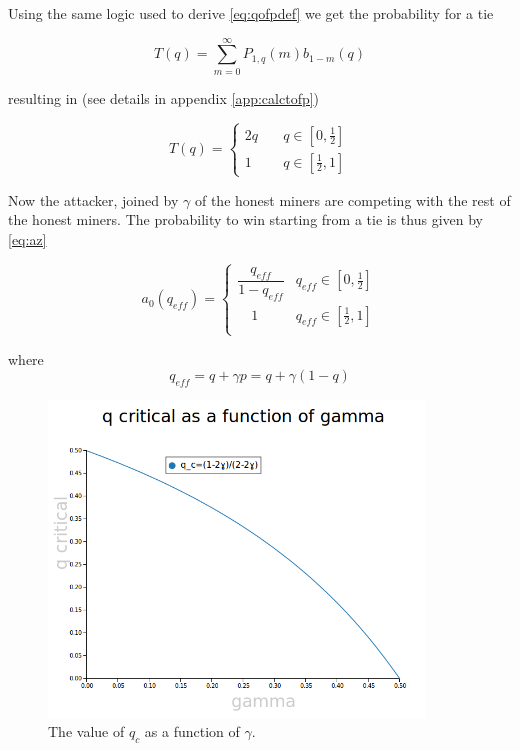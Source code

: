 \documentclass[letterpaper,12pt]{report}
\theoremstyle{plain}
\theoremstyle{definition}
\begin{document}
Using the same logic used to derive \ref{eq:qofpdef} we get the probability for a tie

\begin{equation}\label{eq:qofpdef}
\mathit{T}(q)= \sum_{m=0}^{\infty}\mathit{P}_{1,q}(m)\mathit{b}_{1-m}(q)
\end{equation}

resulting in (see details in appendix \ref{app:calctofp})

\begin{equation}\label{eq:qofp}
\mathit{T}(q)=
\begin{cases}
2q & \quad q \in [0,\frac{1}{2}] \\
1 & \quad q \in [\frac{1}{2},1] 
\end{cases}
\end{equation}

Now the attacker, joined by $\gamma$ of the honest miners are competing with the rest of the honest miners. The probability to win starting from a tie is thus given by \ref{eq:az}

\begin{equation}\label{eq:azeroeff}
\mathit{a}_0(q_{eff})=\begin{cases} \dfrac{q_{eff}}{1-q_{eff}} & q_{eff}\in [0,\frac{1}{2}] \\  
\quad 1 & q_{eff}\in [\frac{1}{2},1] \\ \end{cases}
\end{equation}

where 
\begin{equation}\label{qeff}
q_{eff}=q+\gamma p=q+\gamma(1-q)
\end{equation}

\begin{figure}[qcrit]
\centering
\includegraphics[width=100mm]{qcritical.png}
\caption{The value of $q_c$ as a function of $\gamma$.}
\label{fig:qcritical}
\end{figure}
\end{document}
